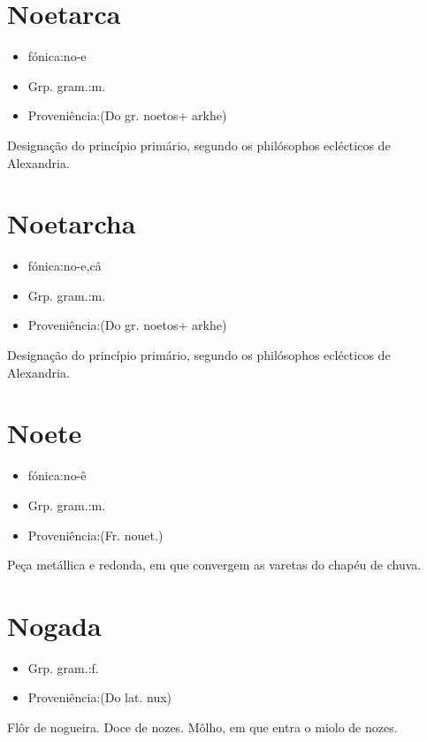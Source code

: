 \section{Noetarca}
\begin{itemize}
\item {fónica:no-e}
\end{itemize}
\begin{itemize}
\item {Grp. gram.:m.}
\end{itemize}
\begin{itemize}
\item {Proveniência:(Do gr. \textunderscore noetos\textunderscore  + \textunderscore arkhe\textunderscore )}
\end{itemize}
Designação do princípio primário, segundo os philósophos eclécticos de Alexandria.
\section{Noetarcha}
\begin{itemize}
\item {fónica:no-e,câ}
\end{itemize}
\begin{itemize}
\item {Grp. gram.:m.}
\end{itemize}
\begin{itemize}
\item {Proveniência:(Do gr. \textunderscore noetos\textunderscore  + \textunderscore arkhe\textunderscore )}
\end{itemize}
Designação do princípio primário, segundo os philósophos eclécticos de Alexandria.
\section{Noete}
\begin{itemize}
\item {fónica:no-ê}
\end{itemize}
\begin{itemize}
\item {Grp. gram.:m.}
\end{itemize}
\begin{itemize}
\item {Proveniência:(Fr. \textunderscore nouet.\textunderscore )}
\end{itemize}
Peça metállica e redonda, em que convergem as varetas do chapéu de chuva.
\section{Nogada}
\begin{itemize}
\item {Grp. gram.:f.}
\end{itemize}
\begin{itemize}
\item {Proveniência:(Do lat. \textunderscore nux\textunderscore )}
\end{itemize}
Flôr de nogueira.
Doce de nozes.
Môlho, em que entra o miolo de nozes.
